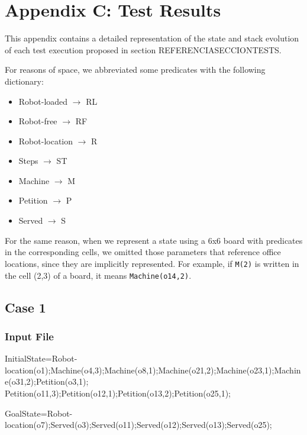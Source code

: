 \documentclass[12pt,a4paper,oneside]{article}
\numberwithin{equation}{section}
\numberwithin{equation}{section}
\theoremstyle{definition}
\begin{document}
\newpage

\section*{Appendix C: Test Results} \label{Test Results}


This appendix contains a detailed representation of the state and stack evolution of each test execution proposed in section REFERENCIASECCIONTESTS.


For reasons of space, we abbreviated some predicates with the following dictionary:
\begin{itemize}
	\item Robot-loaded $\rightarrow$ RL
	\item Robot-free $\rightarrow$ RF
	\item Robot-location $\rightarrow$ R
	\item Steps $\rightarrow$ ST
	\item Machine $\rightarrow$ M
	\item Petition $\rightarrow$ P
	\item Served $\rightarrow$ S
\end{itemize}

For the same reason, when we represent a state using a 6x6 board with predicates in the corresponding cells, we omitted those parameters that reference office locations, since they are implicitly represented. For example, if \texttt{M(2)} is written in the cell (2,3) of a board, it means \texttt{Machine(o14,2)}.


\subsection*{Case 1}

\subsubsection*{Input File}

\begin{listing}[style=consola, numbers=none]
InitialState=Robot-location(o1);Machine(o4,3);Machine(o8,1);Machine(o21,2);Machine(o23,1);Machine(o31,2);Petition(o3,1); Petition(o11,3);Petition(o12,1);Petition(o13,2);Petition(o25,1);

GoalState=Robot-location(o7);Served(o3);Served(o11);Served(o12);Served(o13);Served(o25);
\end{listing}
\end{document}
